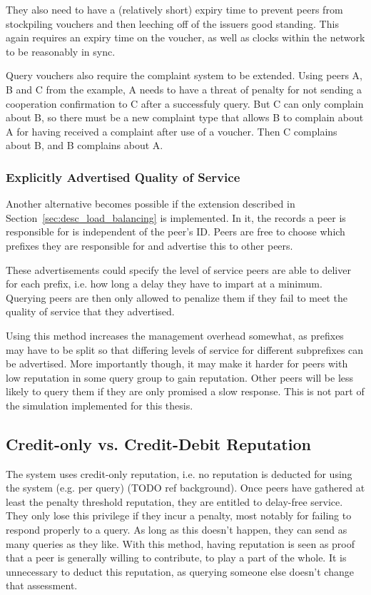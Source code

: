 They also need to have a (relatively short) expiry time to prevent peers from
stockpiling vouchers and then leeching off of the issuers good standing. This
again requires an expiry time on the voucher, as well as clocks within the
network to be reasonably in sync.

Query vouchers also require the complaint system to be extended. Using peers A,
B and C from the example, A needs to have a threat of penalty for not sending a
cooperation confirmation to C after a successfuly query. But C can only complain
about B, so there must be a new complaint type that allows B to complain about A
for having received a complaint after use of a voucher. Then C complains about
B, and B complains about A.

\subsubsection{Explicitly Advertised Quality of Service}
Another alternative becomes possible if the extension described in
Section~\ref{sec:desc_load_balancing} is implemented. In it, the records a peer
is responsible for is independent of the peer's ID. Peers are free to choose
which prefixes they are responsible for and advertise this to other peers.

These advertisements could specify the level of service peers are able to
deliver for each prefix, i.e. how long a delay they have to impart at a minimum.
Querying peers are then only allowed to penalize them if they fail to meet the
quality of service that they advertised.

Using this method increases the management overhead somewhat, as prefixes may
have to be split so that differing levels of service for different subprefixes
can be advertised. More importantly though, it may make it harder for peers with
low reputation in some query group to gain reputation. Other peers will be less
likely to query them if they are only promised a slow response. This is not part
of the simulation implemented for this thesis.

\subsection{Credit-only vs. Credit-Debit Reputation}
\label{sec:desc_credit_only_vs_credit_debit}
The system uses credit-only reputation, i.e. no reputation is deducted for using
the system (e.g. per query) (TODO ref background). Once peers have gathered at
least the penalty threshold reputation, they are entitled to delay-free service.
They only lose this privilege if they incur a penalty, most notably for failing
to respond properly to a query. As long as this doesn't happen, they can send as
many queries as they like. With this method, having reputation is seen as proof
that a peer is generally willing to contribute, to play a part of the whole. It
is unnecessary to deduct this reputation, as querying someone else doesn't
change that assessment.

